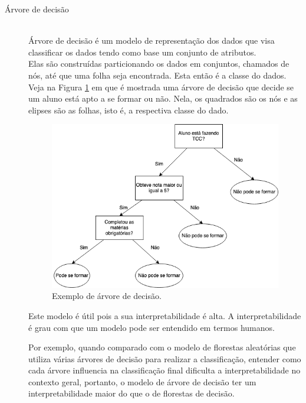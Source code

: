 \begin{description}
    \item[Árvore de decisão] \hfill \\ Árvore de decisão é um modelo de representação 
    dos dados que visa classificar os dados tendo como base um conjunto 
    de atributos. \\ 
    Elas são construídas particionando os dados em conjuntos, chamados de nós, 
    até que uma folha seja encontrada. Esta então é a classe do dados. Veja na Figura \ref{fig:ex_decision_tree} 
    em que é mostrada uma árvore de decisão que decide se um aluno está apto a se formar ou não. 
    Nela, os quadrados são os nós e as elipses são as folhas, isto é, a respectiva classe do 
    dado.
    \begin{figure}
        \centering
        \includegraphics[width=.8\textwidth]{figuras/ex_decicion_tree1.png}
        \caption{Exemplo de árvore de decisão.\label{fig:ex_decision_tree}}
    \end{figure}

    Este modelo é útil pois a sua interpretabilidade é alta. A interpretabilidade é grau com que 
    um modelo pode ser entendido em termos humanos. 
    
    Por exemplo, quando comparado com o modelo de florestas aleatórias que utiliza várias 
    árvores de decisão para realizar a classificação, entender como cada árvore influencia 
    na classificação final dificulta a interpretabilidade no contexto geral, portanto,
    o modelo de árvore de decisão ter um interpretabilidade maior do que o de florestas de decisão.


\end{description}
